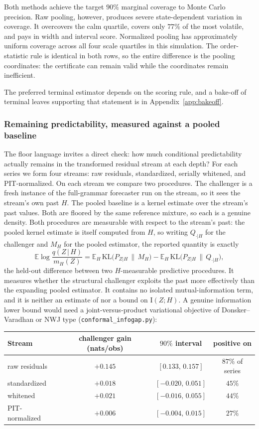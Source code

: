 \documentclass[11pt]{article}
\theoremstyle{remark}
\newcommand{\E}{\mathbb{E}}
\newcommand{\KL}{\mathrm{KL}}
\newcommand{\I}{\mathrm{I}}
\newcommand{\given}{\,|\,}
\begin{document}
Both methods achieve the target $90\%$ marginal coverage to Monte Carlo precision. Raw
pooling, however, produces severe state-dependent variation in coverage. It overcovers the
calm quartile, covers only $77\%$ of the most volatile, and pays in width and interval
score.
Normalized pooling has approximately uniform coverage across all four scale quartiles in this
simulation. The order-statistic rule is
identical in both rows, so
the entire difference is the pooling coordinates: the certificate can remain valid while the
coordinates remain inefficient.

The preferred terminal estimator depends on the scoring rule, and a bake-off of terminal
leaves supporting that statement is in Appendix~\ref{app:bakeoff}.

\subsubsection*{Remaining predictability, measured against a pooled baseline}

The floor language invites a direct check: how much conditional predictability actually
remains in the transformed residual stream at each depth? For each series we form four
streams: raw residuals, standardized, serially whitened, and PIT-normalized. On each stream
we compare two procedures. The challenger is a fresh instance of the full-grammar forecaster
run on the stream, so it sees the stream's own past $H$. The pooled baseline is a kernel
estimate over the stream's past values. Both are floored by the same reference mixture, so
each is a genuine density. Both procedures are measurable with respect to the stream's past: the pooled
kernel estimate is itself computed from $H$, so writing $Q_{\cdot|H}$ for the challenger and
$M_H$ for the pooled estimator, the reported quantity is exactly
\[
\E\log\frac{q(Z\given H)}{m_H(Z)}
=\E_H\,\KL\big(P_{Z|H}\,\|\,M_H\big)-\E_H\,\KL\big(P_{Z|H}\,\|\,Q_{\cdot|H}\big),
\]
the held-out difference between two $H$-measurable predictive procedures. It measures whether
the structural challenger exploits the past more effectively than the expanding pooled
estimator. It contains no isolated mutual-information term, and it is neither an estimate of
nor a bound on $\I(Z;H)$. A genuine information lower bound would need a joint-versus-product
variational objective of Donsker--Varadhan or NWJ type
(\texttt{conformal\_infogap.py}):

\begin{center}
\small
\begin{tabular}{lccc}
\toprule
Stream & challenger gain (nats/obs) & $90\%$ interval & positive on\\
\midrule
raw residuals & $+0.145$ & $[0.133,\,0.157]$ & $87\%$ of series\\
standardized & $+0.018$ & $[-0.020,\,0.051]$ & $45\%$\\
whitened & $+0.021$ & $[-0.016,\,0.055]$ & $44\%$\\
PIT-normalized & $+0.006$ & $[-0.004,\,0.015]$ & $27\%$\\
\bottomrule
\end{tabular}
\end{center}
\end{document}
